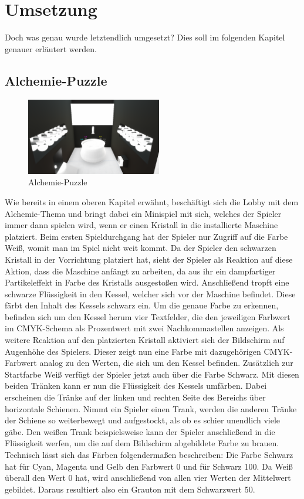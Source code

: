 \chapter{Umsetzung}
Doch was genau wurde letztendlich umgesetzt? Dies soll im folgenden Kapitel genauer erläutert werden.
\section{Alchemie-Puzzle}
\begin{figure}
	\vspace*{-0.5cm}
	\includegraphics[width=5.9cm]{Pictures/Alchemie}
	\caption{Alchemie-Puzzle}
	\vspace*{-0.5cm}
	\label{fig:alchemie_start}
\end{figure}
Wie bereits in einem oberen Kapitel erwähnt, beschäftigt sich die Lobby mit dem Alchemie-Thema und bringt dabei ein Minispiel mit sich, welches der Spieler immer dann spielen wird, wenn er einen Kristall in die installierte Maschine platziert. Beim ersten Spieldurchgang hat der Spieler nur Zugriff auf die Farbe Weiß, womit man im Spiel nicht weit kommt. Da der Spieler den schwarzen Kristall in der Vorrichtung platziert hat, sieht der Spieler als Reaktion auf diese Aktion, dass die Maschine anfängt zu arbeiten, da aus ihr ein dampfartiger Partikeleffekt in Farbe des Kristalls ausgestoßen wird. Anschließend tropft eine schwarze Flüssigkeit in den Kessel, welcher sich vor der Maschine befindet. Diese färbt den Inhalt des Kessels schwarz ein. Um die genaue Farbe zu erkennen, befinden sich um den Kessel herum vier Textfelder, die den jeweiligen Farbwert im CMYK-Schema als Prozentwert mit zwei Nachkommastellen anzeigen. Als weitere Reaktion auf den platzierten Kristall aktiviert sich der Bildschirm auf Augenhöhe des Spielers. Dieser zeigt nun eine Farbe mit dazugehörigen CMYK-Farbwert analog zu den Werten, die sich um den Kessel befinden. Zusätzlich zur Startfarbe Weiß verfügt der Spieler jetzt auch über die Farbe Schwarz. Mit diesen beiden Tränken kann er nun die Flüssigkeit des Kessels umfärben. Dabei erscheinen die Tränke auf der linken und rechten Seite des Bereichs über horizontale Schienen. Nimmt ein Spieler einen Trank, werden die anderen Tränke der Schiene so weiterbewegt und aufgestockt, als ob es schier unendlich viele gäbe. Den weißen Trank beispielsweise kann der Spieler anschließend in die Flüssigkeit werfen, um die auf dem Bildschirm abgebildete Farbe zu brauen. Technisch lässt sich das Färben folgendermaßen beschreiben: Die Farbe Schwarz hat für Cyan, Magenta und Gelb den Farbwert 0 und für Schwarz 100. Da Weiß überall den Wert 0 hat, wird anschließend von allen vier Werten der Mittelwert gebildet. Daraus resultiert also ein Grauton mit dem Schwarzwert 50.\\

